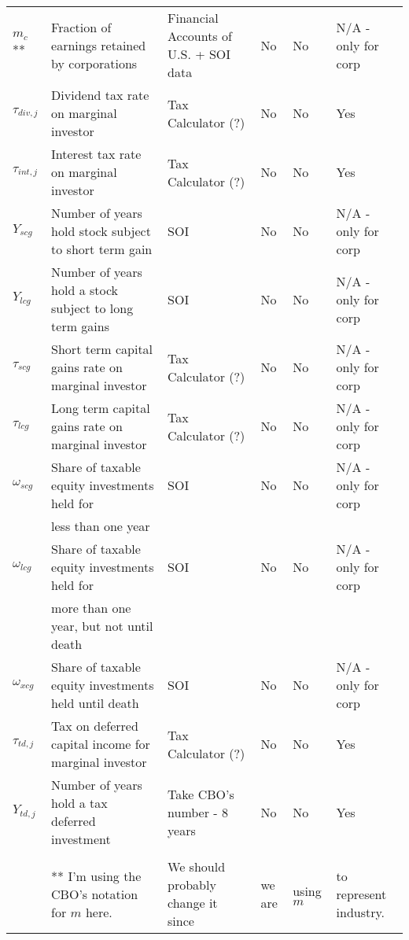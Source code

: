 \documentclass[article,11pt,letterpaper,fleqn]{article}
\theoremstyle{definition}
\numberwithin{equation}{section}
\begin{document}
\begin{landscape}
\begin{table}[htbp]
\begin{tabular}{llllll}
    $m_{c}$** & Fraction of earnings retained by corporations & Financial Accounts of U.S. + SOI data & No    & No    & N/A - only for corp \\
    $\tau_{div,j}$ & Dividend tax rate on marginal investor & Tax Calculator (?) & No    & No    & Yes \\
    $\tau_{int,j}$ & Interest tax rate on marginal investor & Tax Calculator (?) & No    & No    & Yes \\
    $Y_{scg}$ & Number of years hold stock subject to short term gain & SOI   & No    & No    & N/A - only for corp \\
    $Y_{lcg}$ & Number of years hold a stock subject to long term gains & SOI   & No    & No    & N/A - only for corp \\
    $\tau_{scg}$ & Short term capital gains rate on marginal investor & Tax Calculator (?) & No    & No    & N/A - only for corp \\
    $\tau_{lcg}$ & Long term capital gains rate on marginal investor & Tax Calculator (?) & No    & No    & N/A - only for corp \\
    $\omega_{scg}$ & Share of taxable equity investments held for & SOI   & No    & No    & N/A - only for corp \\
    & less than one year  & & & & \\
    $\omega_{lcg}$ & Share of taxable equity investments held for  & SOI   & No    & No    & N/A - only for corp \\
    & more than one year, but not until death & & & & \\
    $\omega_{xcg}$ & Share of taxable equity investments held until death & SOI   & No    & No    & N/A - only for corp \\
    $\tau_{td,j}$ & Tax on deferred capital income for marginal investor & Tax Calculator (?) & No    & No    & Yes \\
    $Y_{td,j}$ & Number of years hold a tax deferred investment & Take CBO's number - 8 years & No    & No    & Yes \\
          &       &       &       &       &  \\
    & ** I'm using the CBO's notation for $m$ here.&  We should probably change it since & we are &  using  $m$ & to represent industry.        \\
    \hline
    \hline
    \end{tabular}%
  \label{tab:param_list}%
\end{table}%
\end{landscape}
\end{document}
